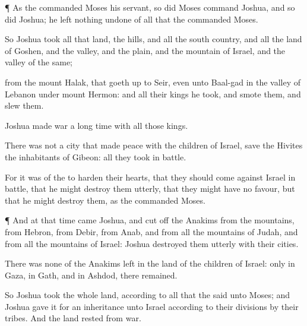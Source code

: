 {\par }{\PP {}¶ As the
{}
commanded
Moses his
servant, so did
Moses
command
Joshua, and so
did
Joshua; he
left
nothing
undone of all that the
{}
commanded
Moses.

So
Joshua
took all that
land, the
hills, and all the south
country, and all the
land of
Goshen, and the
valley, and the
plain, and the
mountain of
Israel, and the
valley of the same;

 from the
mount
Halak, that goeth
up to
Seir, even unto
Baal-gad in the
valley of
Lebanon under
mount
Hermon: and all their
kings he
took, and
smote them, and
slew them.

Joshua
made
war a
long
time with all those
kings.

There was not a
city that made
peace with the
children of
Israel, save the
Hivites the
inhabitants of
Gibeon: all
{} they
took in
battle.

For it was of the
{} to
harden their
hearts, that they should come
against
Israel in
battle, that he might destroy them
utterly,
{} that they might have no
favour, but that he might
destroy them, as the
{}
commanded
Moses.


\par }{\PP {}¶ And at that
time
came
Joshua, and cut
off the
Anakims from the
mountains, from
Hebron, from
Debir, from
Anab, and from all the
mountains of
Judah, and from all the
mountains of
Israel:
Joshua destroyed them
utterly with their
cities.

There was none of the
Anakims
left in the
land of the
children of
Israel: only in
Gaza, in
Gath, and in
Ashdod, there
remained.

So
Joshua
took the whole
land, according to all that the
{}
said unto
Moses; and
Joshua
gave it for an
inheritance unto
Israel according to their
divisions by their
tribes. And the
land
rested from
war.




\par }
